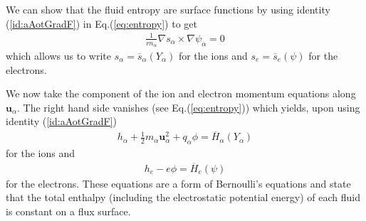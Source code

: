\documentclass[11pt, reqno]{amsart}
\newcommand{\eqr}[1]{Eq.\thinspace(#1)}
\newcommand{\mvec}[1]{\mathbf{#1}}
\theoremstyle{definition}
\begin{document}
We can show that the fluid entropy are surface functions by using
identity ({\ref{id:aAotGradF}}) in \eqr{\ref{eq:entropy}} to get
\begin{align}
   \frac{1}{r n_\alpha} \nabla s_\alpha \times \nabla \psi_\alpha = 0
\end{align}
which allows us to write $s_\alpha = \overline{s}_\alpha(Y_\alpha)$
for the ions and $s_e = \overline{s}_e(\psi)$ for the electrons.

We now take the component of the ion and electron momentum equations
along $\mvec{u}_\alpha$. The right hand side vanishes (see
\eqr{\ref{eq:entropy}}) which yields, upon using identity
({\ref{id:aAotGradF}})
\begin{align}
  h_\alpha + \frac{1}{2}m_\alpha \mvec{u}_\alpha^2 + q_\alpha\phi
  =
  \overline{H}_\alpha(Y_\alpha)
\end{align}
for the ions and
\begin{align}
  h_e - e\phi
  =
  \overline{H}_e(\psi)
\end{align}
for the electrons. These equations are a form of Bernoulli's equations
and state that the total enthalpy (including the electrostatic
potential energy) of each fluid is constant on a flux surface.
\end{document}
